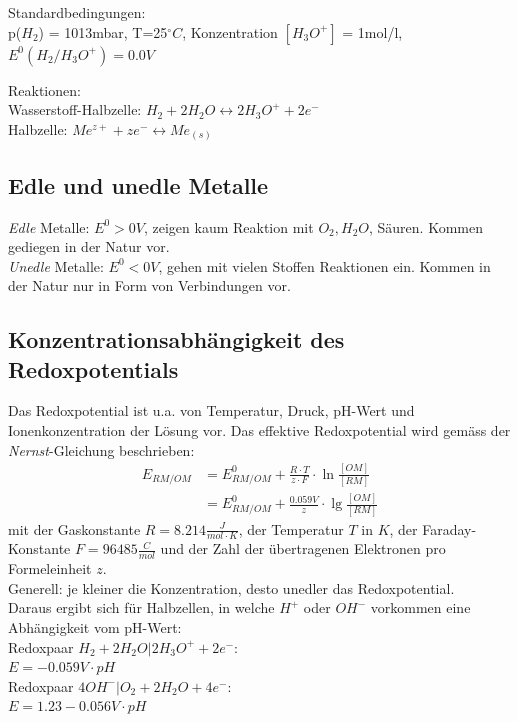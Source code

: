 Standardbedingungen:\\
p($H_2$) = 1013mbar, T=25$^\circ C$, Konzentration $[H_3O^+]$ = 1mol/l, $E^0(H_2/H_3O^+) = 0.0V$

Reaktionen: \\
Wasserstoff-Halbzelle: $H_2 + 2H_2O \leftrightarrow 2 H_3O^+ + 2 e^-$ \\
Halbzelle: $Me^{z+} + z e^- \leftrightarrow Me_{(s)}$ \\


\subsection{Edle und unedle Metalle}
\emph{Edle} Metalle: $E^0 > 0V$, zeigen kaum Reaktion mit $O_2, H_2O$, Säuren. Kommen gediegen in der Natur vor. \\

\emph{Unedle} Metalle: $E^0 < 0V$, gehen mit vielen Stoffen Reaktionen ein. Kommen in der Natur nur in Form von Verbindungen vor. \\

\subsection{Konzentrationsabhängigkeit des Redoxpotentials}
Das Redoxpotential ist u.a. von Temperatur, Druck, pH-Wert und Ionenkonzentration der Lösung vor. Das effektive Redoxpotential wird gemäss der \emph{Nernst}-Gleichung beschrieben:
\begin{eqnarray*}
	E_{RM/OM} &= E^0_{RM/OM} + \frac{R \cdot T}{z \cdot F} \cdot \ln\frac{[OM]}{[RM]} \\ &=  E^0_{RM/OM} + \frac{0.059V}{z} \cdot \lg\frac{[OM]}{[RM]}
\end{eqnarray*}
mit der Gaskonstante $R=8.214\frac{J}{mol \cdot K}$, der Temperatur $T$ in $K$, der Faraday-Konstante $F=96485\frac{C}{mol}$ und der Zahl der übertragenen Elektronen pro Formeleinheit $z$. \\

Generell: je kleiner die Konzentration, desto unedler das Redoxpotential. \\

Daraus ergibt sich für Halbzellen, in welche $H^+$ oder $OH^-$ vorkommen eine Abhängigkeit vom pH-Wert: \\
Redoxpaar $H_2 + 2 H_2O | 2 H_3O^+ + 2 e^-$: \\ $E = -0.059V \cdot pH$ \\
Redoxpaar $4 OH^- | O_2 + 2 H_2O + 4 e^-$: \\ $E = 1.23 - 0.056V \cdot pH$ \\

